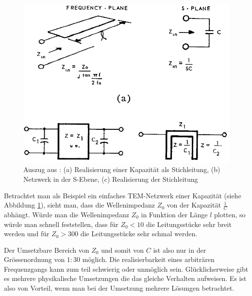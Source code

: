 \begin{figure}[h!]
    \centering
    \includegraphics[width=\imagewidth]{images/bereich}
    \caption{Auszug aus \cite{ref:wenzel}: (a) Realisierung einer Kapazit\"at als Stichleitung, (b) Netzwerk in der S-Ebene, (c) Realisierung der Stichleitung}
    \label{fig:bereich}
\end{figure}

Betrachtet  man als Beispiel  ein  einfaches  TEM-Netzwerk  einer  Kapazit\"at
(siehe Abbildung \ref{fig:bereich}), sieht man, dass die  Wellenimpedanz $Z_0$
von  der Kapazit\"at $\frac{1}{C}$ abh\"angt. W\"urde man  die  Wellenimpedanz
$Z_0$ in Funktion der L\"ange $l$ plotten, so w\"urde man schnell feststellen,
dass f\"ur $Z_0<10$ die Leitungsst\"ucke sehr breit werden und  f\"ur  $Z_0  >
300$ die Leitungsst\"ucke sehr schmal werden.

Der Umsetzbare Bereich von $Z_0$ und  somit  von  $C$  ist  also  nur  in  der
Gr\"ossenordnung von $1:30$ m\"oglich. Die realisierbarkeit eines arbitr\"aren
Frequenzgangs    kann    zum    teil   schwierig   oder   unm\"oglich    sein.
Gl\"ucklicherweise gibt es  mehrere  physikalische Umsetzungen die das gleiche
Verhalten aufweisen.  Es  ist  also  von  Vorteil,  wenn man bei der Umsetzung
mehrere L\"osungen betrachtet.

